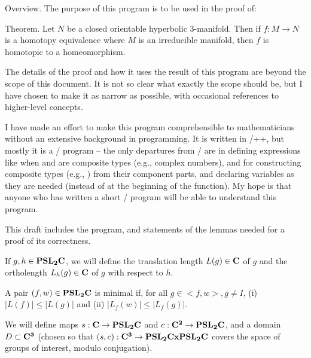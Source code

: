 
\def\Real{\bf R}
\def\Complex{\bf C}
\def\Rdouble{\bf R}
\def\Cdouble{\bf C}
\def\cube{\bf A}
\def\reps#1{\bf S(\hbox{#1})}
\def\abs#1{|{#1}|}
\def\ra{\rightarrow}
\def\shortGen#1{s(#1)}
\def\closeGen#1#2{c(#1,#2)}
\def\PSL{\bf PSL}
\def\PSLC{\PSL_2{\Complex}}
\def\olength#1{\bf L_o(#1)}
\def\Nolength#1#2{\bf L_#2(#1)}
\def\tlength#1{\bf L(#1)}
\def\group#1{\bf G(#1)}
\def\union{\cup}
\def\intersect{\cap}
\def\Union{\bigcup}
\def\Intersect{\bigcap}
\def\cross{x}
\def\lemma#1{LEMMA #1}
\def\endlemma{}
\def\proposition#1{PROPOSITION $#1$}
\def\endproposition{}

Overview.
The purpose of this program is to be used in the proof of:

Theorem.
Let $N$ be a closed orientable hyperbolic
3-manifold.  Then if $f:M\to N$ is a homotopy equivalence where $M$
is an irreducible manifold, then $f$ is  homotopic to a homeomorphism.

The details of the proof and how it uses the result of this program
are beyond the scope of this document.
It is not so clear what exactly the scope should be,
but I have chosen to make it as narrow as possible,
with occasional references to higher-level concepts.

I have made an effort to make this program comprehensible to mathematicians
without an extensive background in programming.
It is written in \CEE/++, but mostly it is a \CEE/ program -- the only
departures from \CEE/ are in defining expressions like  when
 and  are composite types (e.g., complex numbers), and
for constructing composite types (e.g., ) from
their component parts, and declaring variables as they are needed
(instead of at the beginning of the function).
My hope is that anyone who has written a short \CEE/ program will
be able to understand this program.

This draft includes the program, and statements of the lemmas
needed for a proof of its correctness.

If $g,h \in \PSLC$, we will define the
translation length $L(g) \in \Complex$ of $g$
and the ortholength $L_h(g) \in \Complex$ of $g$ with respect to $h$.

A pair $(f,w) \in \PSLC$ is minimal if,
for all $g \in <f,w>, g \ne I$,
(i) $\abs{L(f)} \le \abs{L(g)}$ and
(ii) $\abs{L_f(w)} \le \abs{L_f(g)}$.

We will define maps
$s : \Complex \ra \PSLC$ and
$c : \Complex^2 \ra \PSLC$,
and a domain $D \subset \Complex^3$
(chosen so that $(s,c) : \Complex^3 \ra \PSLC\cross\PSLC$ covers the space
of groups of interest, modulo conjugation).

